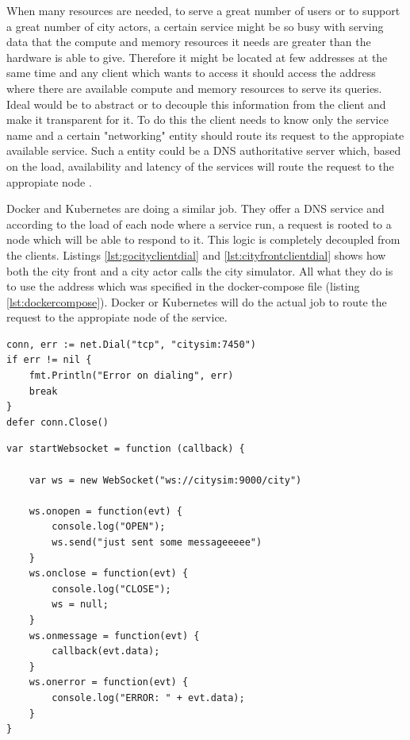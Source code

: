 \documentclass[conference]{IEEEtran}
\begin{document}
When many resources are needed, to serve a great number of users or to support a great number of city actors, a certain service might be so busy with serving data that the compute and memory resources it needs are greater than the hardware is able to give. Therefore it might be located at few addresses at the same time and any client which wants to access it should access the address where there are available compute and memory resources to serve its queries. Ideal would be to abstract or to decouple this information from the client and make it transparent for it. To do this the client needs to know only the service name and a certain "networking" entity should route its request to the appropiate available service. Such a entity could be a DNS authoritative server which, based on the load, availability and latency of the services will route the request to the appropiate node \citep{swildens2006scalable}.

Docker and Kubernetes are doing a similar job. They offer a DNS service and according to the load of each node where a service run, a request is rooted to a node which will be able to respond to it. This logic is completely decoupled from the clients. Listings \ref{lst:gocityclientdial} and \ref{lst:cityfrontclientdial} shows how both the city front and a city actor calls the city simulator. All what they do is to use the address which was specified in the docker-compose file (listing \ref{lst:dockercompose}). Docker or Kubernetes will do the actual job to route the request to the appropiate node of the service.

\begin{lstlisting}[caption=City client dialing City simulator, label=lst:gocityclientdial]
conn, err := net.Dial("tcp", "citysim:7450")
if err != nil {
    fmt.Println("Error on dialing", err)
    break
}
defer conn.Close()
\end{lstlisting}

\begin{lstlisting}[caption=City front dialing City simulator, label=lst:cityfrontclientdial]
var startWebsocket = function (callback) {

    var ws = new WebSocket("ws://citysim:9000/city")

    ws.onopen = function(evt) {
        console.log("OPEN");
        ws.send("just sent some messageeeee")
    }
    ws.onclose = function(evt) {
        console.log("CLOSE");
        ws = null;
    }
    ws.onmessage = function(evt) {
        callback(evt.data);
    }
    ws.onerror = function(evt) {
        console.log("ERROR: " + evt.data);
    }
}
\end{lstlisting}
\end{document}
